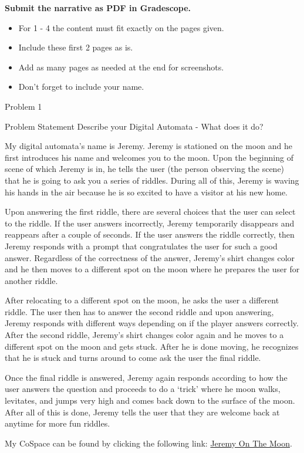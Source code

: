 \textbf{Submit the narrative as PDF in Gradescope.}

\begin{itemize}
    \item For 1 - 4 the content must fit exactly on the pages given.
    \item Include these first 2 pages as is.
    \item Add as many pages as needed at the end for screenshots.
    \item Don’t forget to include your name.
\end{itemize}

\begin{problem}{Problem 1}
    \begin{statement}{Problem Statement}
        Describe your Digital Automata -  What does it do?
    \end{statement}

    \begin{Highlight}[Response]
        My digital automata's name is Jeremy. Jeremy is stationed on the moon and he first introduces his name and welcomes you to the moon. Upon the beginning of scene of which Jeremy is in, he tells
        the user (the person observing the scene) that he is going to ask you a series of riddles. During all of this, Jeremy is waving his hands in the air because he is so excited to have a visitor
        at his new home.

        Upon answering the first riddle, there are several choices that the user can select to the riddle. If the user answers incorrectly, Jeremy temporarily disappears and reappears after a couple of
        seconds. If the user answers the riddle correctly, then Jeremy responds with a prompt that congratulates the user for such a good answer. Regardless of the correctness of the answer, Jeremy's
        shirt changes color and he then moves to a different spot on the moon where he prepares the user for another riddle.

        After relocating to a different spot on the moon, he asks the user a different riddle. The user then has to answer the second riddle and upon answering, Jeremy responds with different ways depending
        on if the player answers correctly. After the second riddle, Jeremy's shirt changes color again and he moves to a different spot on the moon and gets stuck. After he is done moving, he recognizes
        that he is stuck and turns around to come ask the user the final riddle.

        Once the final riddle is answered, Jeremy again responds according to how the user answers the question and proceeds to do a `trick' where he moon walks, levitates, and jumps very high and comes
        back down to the surface of the moon. After all of this is done, Jeremy tells the user that they are welcome back at anytime for more fun riddles.

        My CoSpace can be found by clicking the following link: \href{https://edu.cospaces.io/YQK-GCJ}{Jeremy On The Moon}.
    \end{Highlight}
\end{problem}

